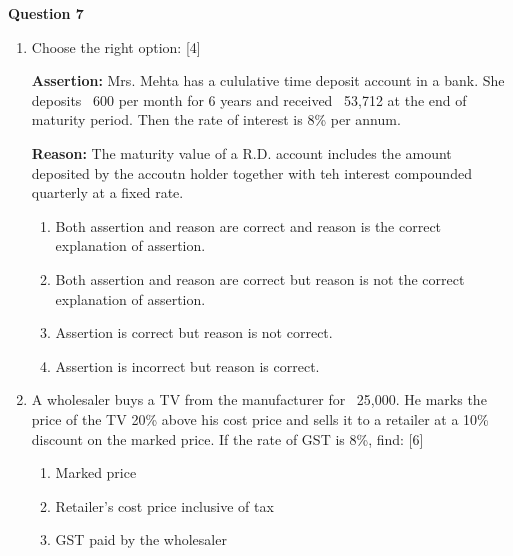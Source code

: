 \noindent
\textbf{Question 7}
\begin{enumerate}[label=(\roman*)]

    \item Choose the right option: \hfill [4]

        \textbf{Assertion:} Mrs. Mehta has a cululative time deposit account 
        in a bank. She deposits \rupee~600 per month for 6 years and received
        \rupee~53,712 at the end of maturity period. Then the rate of interest 
        is 8\% per annum.

        \textbf{Reason:} The maturity value of a R.D. account includes the amount 
        deposited by the accoutn holder together with teh interest compounded
        quarterly at a fixed rate.

        \begin{enumerate}[label={\alph*.}]
            \setlength\itemsep{0em}
            \item Both assertion and reason are correct and reason is the
                correct explanation of assertion.
            \item Both assertion and reason are correct but reason is not
                the correct explanation of assertion.
            \item Assertion is correct but reason is not correct.
            \item Assertion is incorrect but reason is correct.
        \end{enumerate}

    \item A wholesaler buys a TV from the manufacturer for \rupee~25,000. 
        He marks the price of the TV 20\% above his cost price and sells it to 
        a retailer at a 10\% discount on the marked price. If the rate of 
        GST is 8\%, find: \hfill [6]
        \begin{enumerate}
            \setlength\itemsep{0em}
            \item Marked price
            \item Retailer's cost price inclusive of tax
            \item GST paid by the wholesaler
        \end{enumerate}

\end{enumerate}


